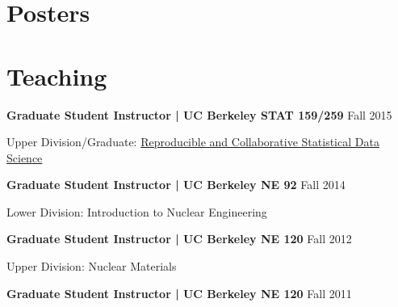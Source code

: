 \documentclass[margin,line]{res}
\let\resumesection\section
\newenvironment{list1}{
  \begin{list}{\ding{113}}{%
      \setlength{\itemsep}{0in}
      \setlength{\parsep}{0in} \setlength{\parskip}{0in}
      \setlength{\topsep}{0in} \setlength{\partopsep}{0in} 
      \setlength{\leftmargin}{0.17in}}}{\end{list}}
\begin{document}
\begin{resume}
\section{\sc Posters}

\renewcommand{\section}[2]{}
\renewcommand{\section}{\resumesection}

\section{\sc Teaching\footnotemark}

{\bf Graduate Student Instructor | UC Berkeley STAT 159/259} \hfill Fall 2015 

\begin{list1}
\item[] Upper Division\footnotemark/Graduate: 
        \href{http://www.jarrodmillman.com/stat159-fall2015/}
             {Reproducible and Collaborative Statistical Data Science}
\end{list1}
{\bf Graduate Student Instructor | UC Berkeley NE 92} \hfill Fall 2014

\begin{list1}
  \item[] Lower Division: Introduction to Nuclear Engineering
\end{list1}
{\bf Graduate Student Instructor | UC Berkeley NE 120} \hfill Fall 2012

\begin{list1}
  \item[] Upper Division: Nuclear Materials
\end{list1}
{\bf Graduate Student Instructor | UC Berkeley NE 120} \hfill Fall 2011


\end{resume}
\end{document}
